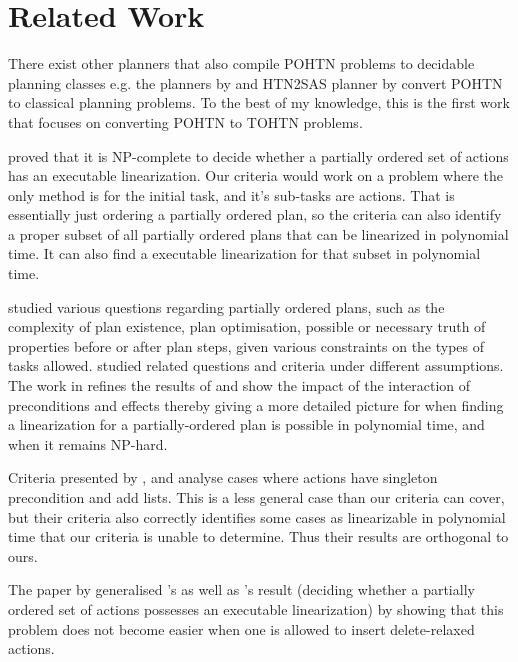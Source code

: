 \section{Related Work}

There exist other planners that also compile POHTN problems to decidable planning classes e.g. the planners by \cite{HTN2STRIPS} and HTN2SAS planner by \cite{HTN2SAS} convert POHTN to classical planning problems. To the best of my knowledge, this is the first work that focuses on converting POHTN to TOHTN problems.

\cite{Erol1996HTNComplexity} proved that it is NP-complete to decide whether a partially ordered set
of actions has an executable linearization. Our criteria would work on a problem where the only method is for the initial task, and it’s sub-tasks are actions. That is essentially just ordering a partially ordered plan, so the criteria can also identify a proper subset of all partially ordered plans that can be linearized in polynomial time. It can also find a executable linearization for that subset in polynomial time.


\cite{NEBEL1994125} studied various questions regarding partially ordered plans, such as the complexity of plan existence, plan optimisation, possible or necessary truth of properties before or after plan steps, given various constraints on the types of tasks allowed.  \cite{KambhampatiModalTruth1996} studied related questions and criteria under different assumptions.
The work in \citep{TanGruningerPOPlanComplexity} refines the results of \cite{NEBEL1994125} and show the impact of the interaction of preconditions and effects thereby giving a more detailed picture for when finding a linearization for a partially-ordered plan is possible in polynomial time, and when it remains NP-hard.

Criteria presented by \cite{NEBEL1994125}, \cite{KambhampatiModalTruth1996} and  \cite{TanGruningerPOPlanComplexity} analyse cases where actions have singleton precondition and add lists. This is a less general case than our criteria can cover, but their criteria also correctly identifies some cases as linearizable in polynomial time that our criteria is unable to determine. Thus their results are orthogonal to ours.

The paper by  generalised \cite{NEBEL1994125}'s as well as \cite{Erol1996HTNComplexity}'s result (deciding whether a partially ordered
set of actions possesses an executable linearization) by showing that this problem does not become easier when one is allowed to insert delete-relaxed  actions.

